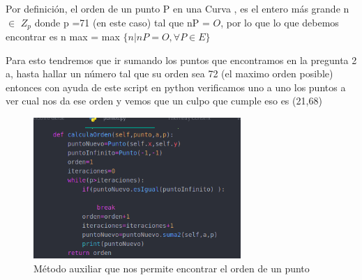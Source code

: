 \documentclass[10pt,a4paper]{article}
\begin{document}
\begin{itemize}
Por definición, el orden de un punto P en una Curva , es el entero más grande n $\in$ $Z_p$ donde p =71 (en este caso)   tal que nP = $O$, por lo que lo que debemos encontrar es
n max = max $\{  n|  nP = O , \forall P \in E \}$

Para esto tendremos que ir sumando los puntos que encontramos en la pregunta 2 a, hasta hallar un número tal que su orden sea 72 (el maximo orden posible) entonces con ayuda de este script  en python verificamos uno a uno los puntos a ver cual nos da ese orden 
 y vemos que un culpo que cumple eso es  (21,68)

\begin{center}

\begin{figure}
\includegraphics[width=0.7\textwidth]{Ejemplo2.png}
\caption{Método auxiliar que nos permite encontrar el orden de un punto}
\label{fig:metoo auxiliar}
\end{figure} 
\end{center}	

\end{itemize}
\end{document}

